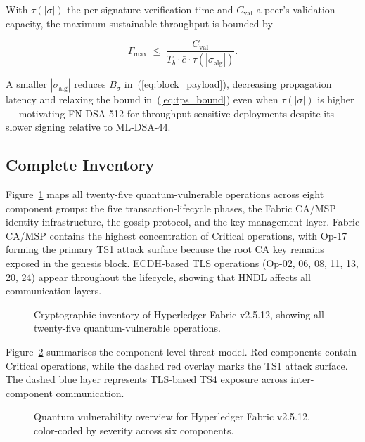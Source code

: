 \documentclass[conference]{IEEEtran}
\begin{document}
With $\tau(|\sigma|)$ the per-signature verification time and
$C_{\mathrm{val}}$ a peer's validation capacity, the maximum sustainable
throughput is bounded by

\begin{equation}
\Gamma_{\max} \;\leq\; \frac{C_{\mathrm{val}}}{T_b \cdot \bar{e} \cdot
\tau(|\sigma_{\mathrm{alg}}|)}.
\label{eq:tps_bound}
\end{equation}

A smaller $|\sigma_{\mathrm{alg}}|$ reduces $B_{\sigma}$
in~(\ref{eq:block_payload}), decreasing propagation latency and relaxing the
bound in~(\ref{eq:tps_bound}) even when $\tau(|\sigma|)$ is higher --- motivating
FN-DSA-512 for throughput-sensitive deployments despite its slower signing
relative to ML-DSA-44.

\subsection{Complete Inventory}
Figure~\ref{fig:crypto_inventory} maps all twenty-five quantum-vulnerable
operations across eight component groups: the five transaction-lifecycle
phases, the Fabric CA/MSP identity infrastructure, the gossip protocol, and
the key management layer. Fabric CA/MSP contains the highest
concentration of Critical operations, with Op-17 forming the primary TS1 attack
surface because the root CA key remains exposed in the genesis block. ECDH-based
TLS operations (Op-02, 06, 08, 11, 13, 20, 24) appear throughout the lifecycle,
showing that HNDL affects all communication layers.

\begin{figure}[tbp]
\centering

\caption{Cryptographic inventory of Hyperledger Fabric v2.5.12, showing all twenty-five quantum-vulnerable operations.}
\label{fig:crypto_inventory}
\end{figure}

Figure~\ref{fig:threat_model_overview} summarises the component-level threat
model. Red components contain Critical operations, while the dashed red overlay
marks the TS1 attack surface. The dashed blue layer represents TLS-based TS4
exposure across inter-component communication.

\begin{figure}[tbp]
\centering

\caption{Quantum vulnerability overview for Hyperledger Fabric v2.5.12, color-coded by severity across six components.}
\label{fig:threat_model_overview}
\end{figure}
\end{document}
